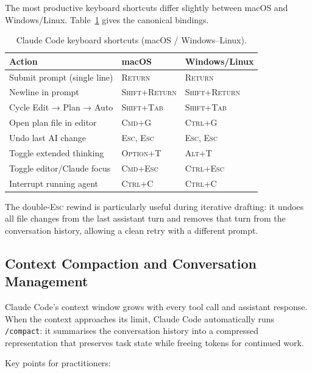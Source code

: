 The most productive keyboard shortcuts differ slightly between macOS and
Windows/Linux.  Table~\ref{tab:claude-code-keys} gives the canonical bindings.

\begin{table}[ht]
\centering
\caption{Claude Code keyboard shortcuts (macOS / Windows--Linux).}
\label{tab:claude-code-keys}
\begin{tabular}{lll}
\toprule
\textbf{Action} & \textbf{macOS} & \textbf{Windows/Linux} \\
\midrule
Submit prompt (single line)    & \textsc{Return}    & \textsc{Return} \\
Newline in prompt              & \textsc{Shift+Return} & \textsc{Shift+Return} \\
Cycle Edit → Plan → Auto       & \textsc{Shift+Tab} & \textsc{Shift+Tab} \\
Open plan file in editor       & \textsc{Cmd+G}     & \textsc{Ctrl+G} \\
Undo last AI change            & \textsc{Esc, Esc}  & \textsc{Esc, Esc} \\
Toggle extended thinking       & \textsc{Option+T}  & \textsc{Alt+T} \\
Toggle editor/Claude focus     & \textsc{Cmd+Esc}   & \textsc{Ctrl+Esc} \\
Interrupt running agent        & \textsc{Ctrl+C}    & \textsc{Ctrl+C} \\
\bottomrule
\end{tabular}
\end{table}

The double-\textsc{Esc} rewind is particularly useful during iterative
drafting: it undoes all file changes from the last assistant turn and removes
that turn from the conversation history, allowing a clean retry with a different
prompt.

\subsection{Context Compaction and Conversation Management}
\label{app:claude-code:context}

Claude Code's context window grows with every tool call and assistant response.
When the context approaches its limit, Claude Code automatically runs
\texttt{/compact}: it summarises the conversation history into a compressed
representation that preserves task state while freeing tokens for continued
work.

Key points for practitioners:

